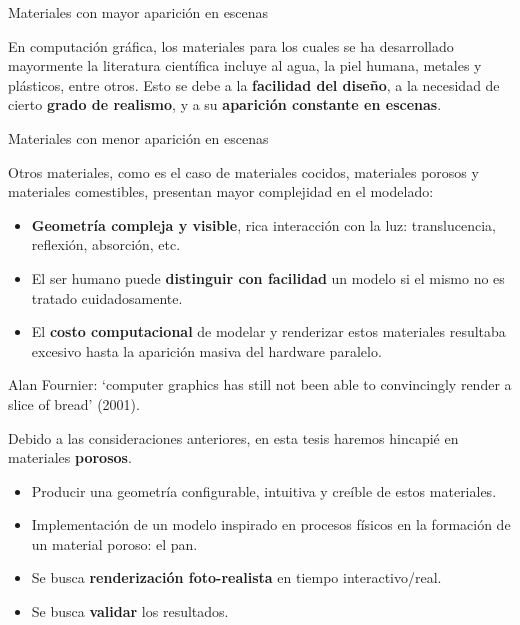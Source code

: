 \documentclass[spanish]{beamer}
\begin{document}
\begin{frame}{Materiales con mayor aparición en escenas}

En computación gráfica, los materiales para los cuales se ha desarrollado mayormente la literatura científica incluye al agua, la piel humana, metales y plásticos, entre otros. Esto se debe a la \textbf{facilidad del diseño}, a la necesidad de cierto \textbf{grado de realismo}, y a su \textbf{aparición constante en escenas}.

\end{frame}

\begin{frame}{Materiales con menor aparición en escenas}

Otros materiales, como es el caso de materiales cocidos, materiales porosos y materiales comestibles, presentan mayor complejidad en el modelado:

\begin{itemize}
\item \textbf{Geometría compleja y visible}, rica interacción con la luz: translucencia, reflexión, absorción, etc.
\item El ser humano puede \textbf{distinguir con facilidad} un modelo si el mismo no es tratado cuidadosamente.
\item El \textbf{costo computacional} de modelar y renderizar estos materiales resultaba excesivo hasta la aparición masiva del hardware paralelo.
\end{itemize}

Alan Fournier: `computer graphics has still not been
able to convincingly render a slice of bread' (2001). 


\end{frame}

\begin{frame}
\begin{block}{}
Debido a las consideraciones anteriores, en esta tesis haremos hincapié en materiales \textbf{porosos}.

\begin{itemize}
\item Producir una geometría configurable, intuitiva y creíble de estos materiales.
\item Implementación de un modelo inspirado en procesos físicos en la formación de un material poroso: el pan.
\item Se busca \textbf{renderización foto-realista} en tiempo interactivo/real.
\item Se busca \textbf{validar} los resultados.
\end{itemize}



\end{block}
\end{frame}
\end{document}
